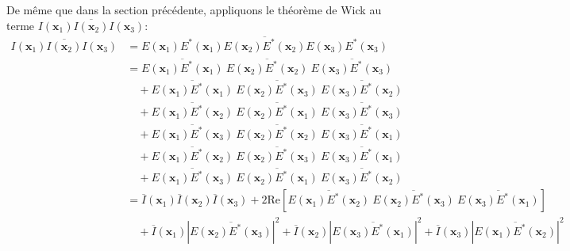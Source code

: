 De même que dans la section précédente, appliquons le théorème de Wick au terme $\overline{I(\mathbf{x}_1) I(\mathbf{x}_2) I(\mathbf{x}_3)}$:
\begin{align}
\overline{I(\mathbf{x}_1)I(\mathbf{x}_2)I(\mathbf{x}_3)} &= \overline{E(\mathbf{x}_1)E^*(\mathbf{x}_1)E(\mathbf{x}_2)E^*(\mathbf{x}_2)E(\mathbf{x}_3)E^*(\mathbf{x}_3)} \\
&= \overline{E(\mathbf{x}_1)E^*(\mathbf{x}_1)}\:\overline{E(\mathbf{x}_2)E^*(\mathbf{x}_2)}\:\overline{E(\mathbf{x}_3)E^*(\mathbf{x}_3)} \\
\nonumber & \quad + \overline{E(\mathbf{x}_1)E^*(\mathbf{x}_1)}\:\overline{E(\mathbf{x}_2)E^*(\mathbf{x}_3)}\:\overline{E(\mathbf{x}_3)E^*(\mathbf{x}_2)} \\
\nonumber & \quad + \overline{E(\mathbf{x}_1)E^*(\mathbf{x}_2)}\:\overline{E(\mathbf{x}_2)E^*(\mathbf{x}_1)}\:\overline{E(\mathbf{x}_3)E^*(\mathbf{x}_3)} \\
\nonumber & \quad + \overline{E(\mathbf{x}_1)E^*(\mathbf{x}_3)}\:\overline{E(\mathbf{x}_2)E^*(\mathbf{x}_2)}\:\overline{E(\mathbf{x}_3)E^*(\mathbf{x}_1)} \\
\nonumber & \quad + \overline{E(\mathbf{x}_1)E^*(\mathbf{x}_2)}\:\overline{E(\mathbf{x}_2)E^*(\mathbf{x}_3)}\:\overline{E(\mathbf{x}_3)E^*(\mathbf{x}_1)} \\
\nonumber & \quad + \overline{E(\mathbf{x}_1)E^*(\mathbf{x}_3)}\:\overline{E(\mathbf{x}_2)E^*(\mathbf{x}_1)}\:\overline{E(\mathbf{x}_3)E^*(\mathbf{x}_2)} \\
\nonumber&= \overline{I}(\mathbf{x}_1) \overline{I}(\mathbf{x}_2) \overline{I}(\mathbf{x}_3) +2 \mathrm{Re}\left[ \overline{E(\mathbf{x}_1)E^*(\mathbf{x}_2)}\:\overline{E(\mathbf{x}_2)E^*(\mathbf{x}_3)}\:\overline{E(\mathbf{x}_3)E^*(\mathbf{x}_1)} \right] \\
& \quad + \overline{I}(\mathbf{x}_1) \left|\overline{E(\mathbf{x}_2)E^*(\mathbf{x}_3)}\right|^2 + \overline{I}(\mathbf{x}_2) \left|\overline{E(\mathbf{x}_3)E^*(\mathbf{x}_1)}\right|^2 + \overline{I}(\mathbf{x}_3) \left|\overline{E(\mathbf{x}_1)E^*(\mathbf{x}_2)}\right|^2
\end{align}

